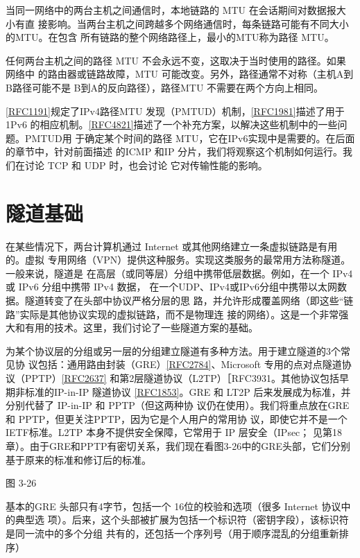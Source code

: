当同一网络中的两台主机之间通信时，本地链路的 MTU 在会话期间对数据报大小有直
接影响。当两台主机之间跨越多个网络通信时，每条链路可能有不同大小的MTU。在包含
所有链路的整个网络路径上，最小的MTU称为路径 MTU。

任何两台主机之间的路径 MTU 不会永远不变，这取决于当时使用的路径。如果网络中
的路由器或链路故障，MTU 可能改变。另外，路径通常不对称（主机A到B路径可能不是
B到A的反向路径），路径MTU 不需要在两个方向上相同。

\href{https://www.rfc-editor.org/rfc/rfc1191}{[RFC1191]}规定了IPv4路径MTU 发现（PMTUD）机制，\href{https://www.rfc-editor.org/rfc/rfc1981}{[RFC1981]}描述了用于1Pv6
的相应机制。\href{https://www.rfc-editor.org/rfc/rfc4821}{[RFC4821]}描述了一个补充方案，以解决这些机制中的一些问题。PMTUD用
于确定某个时间的路径 MTU，它在IPv6实现中是需要的。在后面的章节中，针对前面描述
的ICMP 和IP 分片，我们将观察这个机制如何运行。我们在讨论 TCP 和 UDP 时，也会讨论
它对传输性能的影响。

\section{隧道基础}

在某些情况下，两台计算机通过 Internet 或其他网络建立一条虚拟链路是有用的。虚拟
专用网络（VPN）提供这种服务。实现这类服务的最常用方法称隧道。一般来说，隧道是
在高层（或同等层）分组中携带低层数据。例如，在一个 IPv4或 IPv6 分组中携带 IPv4 数据，
在一个UDP、IPv4或IPv6分组中携带以太网数据。隧道转变了在头部中协议严格分层的思
路，并允许形成覆盖网络（即这些“链路”实际是其他协议实现的虚拟链路，而不是物理连
接的网络）。这是一个非常强大和有用的技术。这里，我们讨论了一些隧道方案的基础。

为某个协议层的分组或另一层的分组建立隧道有多种方法。用于建立隧道的3个常见协
议包括：通用路由封装（GRE）\href{https://www.rfc-editor.org/rfc/rfc2784}{[RFC2784]}、Microsoft 专用的点对点隧道协议（PPTP）\href{https://www.rfc-editor.org/rfc/rfc2637}{[RFC2637]}
和第2层隧道协议（L2TP）［RFC3931。其他协议包括早期非标准的IP-in-IP 隧道协议
\href{https://www.rfc-editor.org/rfc/rfc1853}{[RFC1853]}。GRE 和 LT2P 后来发展成为标准，并分别代替了 IP-in-IP 和 PPTP（但这两种协
议仍在使用）。我们将重点放在GRE 和 PPTP，但更关注PPTP，因为它是个人用户的常用协
议，即使它并不是一个 IETF标准。L2TP 本身不提供安全保障，它常用于 IP 层安全（IPsec；
见第18章）。由于GRE和PPTP有密切关系，我们现在看图3-26中的GRE头部，它们分别
基于原来的标准和修订后的标准。

图 3-26

基本的GRE 头部只有4字节，包括一个 16位的校验和选项（很多 Internet 协议中的典型选
项）。后来，这个头部被扩展为包括一个标识符（密钥字段），该标识符是同一流中的多个分组
共有的，还包括一个序列号（用于顺序混乱的分组重新排序）

